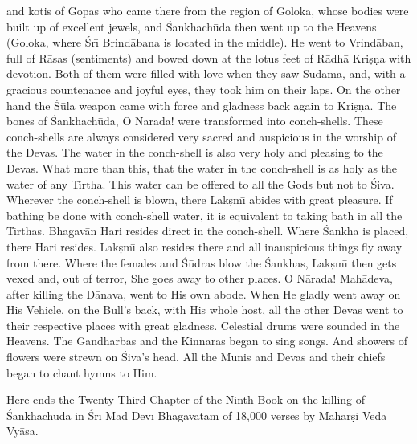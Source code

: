and kotis of Gopas who came there from the region of Goloka, whose bodies were built up of excellent jewels, and \'Sankhach\=uda then went up to the Heavens (Goloka, where \'Sr\={\i} Brind\=abana is located in the middle). He went to Vrind\=aban, full of R\=asas (sentiments) and bowed down at the lotus feet of R\=adh\=a Kri\d{s}\d{n}a with devotion. Both of them were filled with love when they saw Sud\=am\=a, and, with a gracious countenance and joyful eyes, they took him on their laps. On the other hand the \'S\=ula weapon came with force and gladness back again to Kri\d{s}\d{n}a. The bones of \'Sankhach\=uda, O Narada! were transformed into conch-shells. These conch-shells are always considered very sacred and auspicious in the worship of the Devas. The water in the conch-shell is also very holy and pleasing to the Devas. What more than this, that the water in the conch-shell is as holy as the water of any T\={\i}rtha. This water can be offered to all the Gods but not to \'Siva. Wherever the conch-shell is blown, there Lak\d{s}m\={\i} abides with great pleasure. If bathing be done with conch-shell water, it is equivalent to taking bath in all the T\={\i}rthas. Bhagav\=an Hari resides direct in the conch-shell. Where \'Sankha is placed, there Hari resides. Lak\d{s}m\={\i} also resides there and all inauspicious things fly away from there. Where the females and \'S\=udras blow the \'Sankhas, Lak\d{s}m\={\i} then gets vexed and, out of terror, She goes away to other places. O N\=arada! Mah\=adeva, after killing the D\=anava, went to His own abode. When He gladly went away on His Vehicle, on the Bull's back, with His whole host, all the other Devas went to their respective places with great gladness. Celestial drums were sounded in the Heavens. The Gandharbas and the Kinnaras began to sing songs. And showers of flowers were strewn on \'Siva's head. All the Munis and Devas and their chiefs began to chant hymns to Him.

Here ends the Twenty-Third Chapter of the Ninth Book on the killing of \'Sankhach\=uda in \'Sr\={\i} Mad Dev\={\i} Bh\=agavatam of 18,000 verses by Mahar\d{s}i Veda Vy\=asa.



